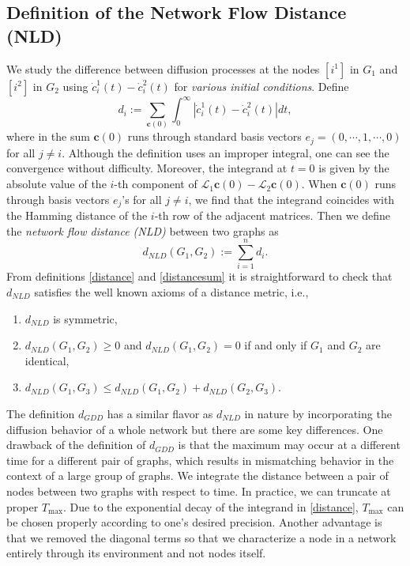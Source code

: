 \documentclass{amsart}
\begin{document}
\subsection{ Definition of the Network Flow Distance (NLD)}

We study the difference between diffusion processes  at the nodes $[i^1]$ in $G_1$ and $[i^2]$ in $G_2$ using $\dot{c}^1_i(t)-\dot{c}^2_i(t)$ for {\em various initial conditions}. Define 
\begin{equation}\label{distance}
d_i:=\sum_{\textbf{c}(0)}\int_0^\infty |\dot{c}_i^1(t)-\dot{c}_i^2(t)|dt,
\end{equation}
where in the sum $\textbf{c}(0)$ runs through standard basis vectors $e_j=(0,\cdots,1,\cdots,0)$ for all $j\neq i$. Although the definition uses an improper integral, one can see the convergence without difficulty. Moreover, the integrand at $t=0$ is given by the absolute value of the $i$-th component of $\mathcal{L}_1\textbf{c}(0)-\mathcal{L}_2\textbf{c}(0)$. When $\textbf{c}(0)$ runs through basis vectors $e_j$'s for all $j\neq i$, we find that the integrand coincides with the Hamming distance of the $i$-th row of the adjacent matrices. 
Then we define the {\em network flow distance (NLD)} between two graphs as 
\begin{equation}\label{distancesum}
d_{NLD}(G_1,G_2):=\sum_{i=1}^nd_i.
\end{equation}
From definitions \eqref{distance} and \eqref{distancesum} it is straightforward to check that $d_{NLD}$ satisfies the well known axioms of a distance metric, i.e., 
\begin{enumerate}
	\item[(i)] $d_{NLD}$ is symmetric,
	\item[(ii)]  $d_{NLD}(G_1,G_2)\geq 0$ and $d_{NLD}(G_1,G_2)=0$ if and only if $G_1$ and $G_2$ are identical,
	\item[(iii)] $d_{NLD}(G_1,G_3)\leq d_{NLD}(G_1,G_2)+d_{NLD}(G_2,G_3)$.
\end{enumerate}
The definition $d_{GDD}$ has a similar flavor as $d_{NLD}$ in nature by incorporating the diffusion behavior of a whole network but there are some key differences. One drawback of the definition of $d_{GDD}$ is that the maximum may occur at  a different time for a different pair of graphs, which results in mismatching behavior in the context of a large group of graphs. We integrate the distance between a pair of nodes between two graphs with respect to time. In practice, we can truncate at proper $T_{\max}$. Due to the exponential decay of the integrand in \eqref{distance}, $T_{\max}$ can be chosen properly according to one's desired precision.  Another advantage is that we removed the diagonal terms so that we characterize a node in a network entirely through its environment and not  nodes itself. 
\end{document}
